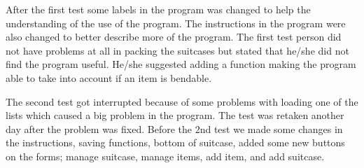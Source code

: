 After the first test some labels in the program was changed to help the understanding of the use of the program. The instructions in the program were also changed to better describe more of the program. The first test person did not have problems at all in packing the suitcases but stated that he/she did not find the program useful. He/she suggested adding a function making the program able to take into account if an item is bendable.

The second test got interrupted because of some problems with loading one of the lists which caused a big problem in the program. The test was retaken another day after the problem was fixed. Before the 2nd test we made some changes in the instructions, saving functions, bottom of suitcase, added some new buttons on the forms; manage suitcase, manage items, add item, and add suitcase.
